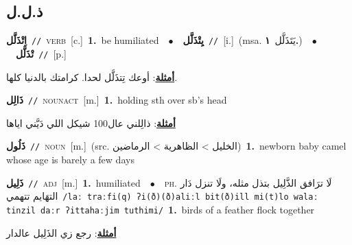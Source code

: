 \documentclass[10pt,a4paper,twoside]{article} %
\begin{document}
\begin{multicols}{2}
{{{{{{\vspace{-3mm}
\subsection*{\color{blue}\foreignlanguage{arabic}{ذ.ل.ل}\color{blue}{}} 

{\setlength\topsep{0pt}\textbf{\foreignlanguage{arabic}{اِتْذَلَّل}}\ {\color{gray}\texttt{//}\color{black}}\ \textsc{verb}\ [c.]\ \textbf{1.}~be humiliated\ \ $\bullet$\ \ \setlength\topsep{0pt}\textbf{\foreignlanguage{arabic}{يِتْذَلَّل}}\ {\color{gray}\texttt{//}\color{black}}\ [i.]\ \color{gray}(msa. \foreignlanguage{arabic}{يَتَذَلَّل}~\foreignlanguage{arabic}{\textbf{١.}})\color{black}\ \ $\bullet$\ \ \setlength\topsep{0pt}\textbf{\foreignlanguage{arabic}{تْذَلَّل}}\ {\color{gray}\texttt{//}\color{black}}\ [p.]\  \begin{flushright}\color{gray}\foreignlanguage{arabic}{\textbf{\underline{\foreignlanguage{arabic}{أمثلة}}}: أوعك تِتذَلَّل لحدا. كرامتك بالدنيا كلها.}\end{flushright}\color{black}} \vspace{2mm}

{\setlength\topsep{0pt}\textbf{\foreignlanguage{arabic}{ذَالِل}}\ {\color{gray}\texttt{//}\color{black}}\ \textsc{noun\textunderscore act}\ [m.]\ \textbf{1.}~holding sth over sb's head\  \begin{flushright}\color{gray}\foreignlanguage{arabic}{\textbf{\underline{\foreignlanguage{arabic}{أمثلة}}}: ذالِلني عال100 شيكل اللي دَيَّني اياها}\end{flushright}\color{black}} \vspace{2mm}

{\setlength\topsep{0pt}\textbf{\foreignlanguage{arabic}{ذَلُول}}\ {\color{gray}\texttt{//}\color{black}}\ \textsc{noun}\ [m.]\ (src. \color{gray}\foreignlanguage{arabic}{الخليل > الظاهرية > الرماضين}\color{black})\ \textbf{1.}~newborn baby camel whose age is barely a few days\ 

{\setlength\topsep{0pt}\textbf{\foreignlanguage{arabic}{ذَلِيل}}\ {\color{gray}\texttt{//}\color{black}}\ \textsc{adj}\ [m.]\ \textbf{1.}~humiliated\ \ $\bullet$\ \ \textsc{ph.} \color{gray} \foreignlanguage{arabic}{لَا ترَافق الذَّلِيل بتذل مثله، ولَا تنزل دَار التهَايم تتهمي}\color{black}\ {\color{gray}\texttt{/{\sffamily laː traːfi(q) ʔi(ð)(ð)aliːl bit(ð)ill mi(t)lo walaː tinzil daːr ʔittahaːjim tuthimi}/}\color{black}}\ \textbf{1.}~birds of a feather flock together\  \begin{flushright}\color{gray}\foreignlanguage{arabic}{\textbf{\underline{\foreignlanguage{arabic}{أمثلة}}}: رجع زي الذَلِيل عالدار}\end{flushright}\color{black}} \vspace{2mm}

}}}}}}}
\end{multicols}
\end{document}
